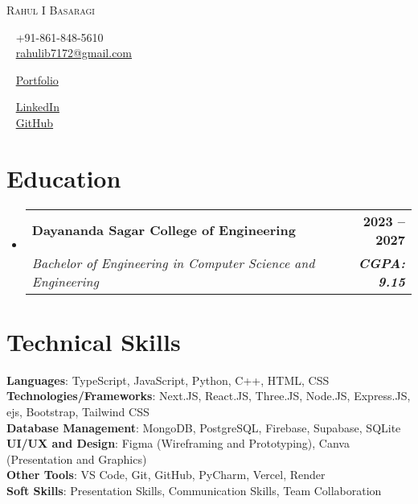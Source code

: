 \documentclass[letterpaper,11pt]{article}
\makeatletter
\newcommand{\resumeSubheading}[4]{
  \vspace{-2pt}\item
    \begin{tabular*}{1.0\textwidth}[t]{l@{\extracolsep{\fill}}r}
      \textbf{#1} & \textbf{\small #2} \\
      \textit{\small#3} & \textit{\small #4} \\
    \end{tabular*}\vspace{-7pt}
}
\newcommand{\resumeSubHeadingListStart}{\begin{itemize}[leftmargin=0.0in, label={}]}
\newcommand{\resumeSubHeadingListEnd}{\end{itemize}}
\makeatother
\begin{document}
\begin{center}
  {\Huge \scshape Rahul I Basaragi} \\[4pt]
  \begin{minipage}[t]{0.3\textwidth}
    \raggedright
    \faPhone~ +91-861-848-5610 \\
    \faEnvelope~ \href{mailto:rahulib7172@gmail.com}{rahulib7172@gmail.com}
  \end{minipage}
  \begin{minipage}[t]{0.35\textwidth}
    \centering
    \faGlobe~ \href{https://rahulibasaragi.tech}{Portfolio} \\
  \end{minipage}
  \begin{minipage}[t]{0.3\textwidth}
    \raggedleft
    \faLinkedin~ \href{https://www.linkedin.com/in/rahul-i-basaragi-05886829b/}{LinkedIn} \\
    \faGithub~ \href{https://github.com/RahulIB5}{GitHub}
  \end{minipage}
\end{center}




\section{Education}
\resumeSubHeadingListStart
    \resumeSubheading
      {Dayananda Sagar College of Engineering} {2023 -- 2027}
      {Bachelor of Engineering in Computer Science and Engineering } {\textbf{CGPA: 9.15}}
\resumeSubHeadingListEnd


\section{Technical Skills}
 \begin{itemize}[leftmargin=0.15in, label={}]
    \small{\item{
     \textbf{Languages}{: TypeScript, JavaScript, Python, C++, HTML, CSS} \\
     \textbf{Technologies/Frameworks}{: Next.JS, React.JS, Three.JS, Node.JS, Express.JS,  ejs, Bootstrap, Tailwind CSS} \\
     \textbf{Database Management}{: MongoDB, PostgreSQL, Firebase, Supabase, SQLite} \\
     \textbf{UI/UX and Design}{: Figma (Wireframing and Prototyping), Canva (Presentation and Graphics)} \\
     \textbf{Other Tools}{: VS Code, Git, GitHub, PyCharm, Vercel, Render} \\
     \textbf{Soft Skills}{: Presentation Skills, Communication Skills, Team Collaboration } \\
    }}
 \end{itemize}
 \vspace{-16pt}
\end{document}
